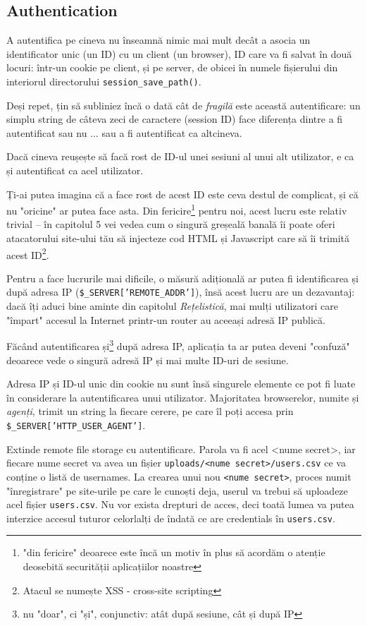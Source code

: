 \subsection{Authentication}
A autentifica pe cineva nu înseamnă nimic mai mult decât a asocia
un identificator unic (un ID) cu un client (un browser), ID
care va fi salvat în două locuri: într-un cookie pe client, și pe
server, de obicei în numele fișierului din interiorul directorului
\texttt{session\_save\_path()}.

Deși repet, țin să subliniez încă o dată cât de \textit{fragilă} este această
autentificare: un simplu string de câteva zeci de caractere
(session ID) face diferența dintre a fi autentificat sau nu ... sau
a fi autentificat ca altcineva.

Dacă cineva reușește să facă rost de ID-ul unei sesiuni al unui
alt utilizator, e ca și autentificat ca acel utilizator.

Ți-ai putea imagina că a face rost de acest ID este ceva destul de
complicat, și că nu "oricine" ar putea face asta. Din fericire\footnote{"din
fericire" deoarece este încă un motiv în plus să acordăm o atenție
deosebită securității aplicațiilor noastre} pentru noi, acest lucru este
relativ trivial  -- în capitolul 5 vei vedea cum o singură greșeală
banală îi poate oferi atacatorului site-ului tău să injecteze cod HTML
și Javascript care să îi trimită acest ID\footnote{Atacul se numește
XSS - cross-site scripting}.

Pentru a face lucrurile mai dificile, o măsură adițională ar putea
fi identificarea și după adresa IP (\texttt{\$\_SERVER['REMOTE\_ADDR']}),
însă acest lucru are un dezavantaj: dacă îți aduci bine aminte din
capitolul \textit{Rețelistică}, mai mulți utilizatori care "împart"
accesul la Internet printr-un router au aceeași adresă IP publică.

Făcând autentificarea și\footnote{nu "doar", ci "și", conjunctiv: atât
după sesiune, cât și după IP} după adresa IP, aplicația ta ar putea
deveni "confuză" deoarece vede o singură adresă IP și mai multe
ID-uri de sesiune.

Adresa IP și ID-ul unic din cookie nu sunt însă singurele elemente
ce pot fi luate în considerare la autentificarea unui utilizator.
Majoritatea browserelor, numite și \textsl{agenți}, trimit un string
la fiecare cerere, pe care îl poți accesa prin \texttt{\$\_SERVER['HTTP\_USER\_AGENT']}.

\begin{Exercise}[title={O schemă de autentificare ieșită din comun},difficulty=2]
Extinde {\glqq}remote file storage{\grqq} cu autentificare.
Parola va fi acel {\glqq}<nume secret>{\grqq}, iar fiecare {\glqq}nume
secret{\grqq} va avea un fișier \texttt{uploads/<nume secret>/users.csv}
ce va conține o listă de usernames. La crearea unui nou \texttt{<nume secret>},
proces numit "înregistrare" pe site-urile pe care le cunoști deja,
userul va trebui să uploadeze acel fișier \texttt{users.csv}. Nu vor exista
drepturi de acces, deci toată lumea va putea interzice accesul tuturor celorlalți
de \^indată ce are credentials \^in \texttt{users.csv}.
\end{Exercise}

